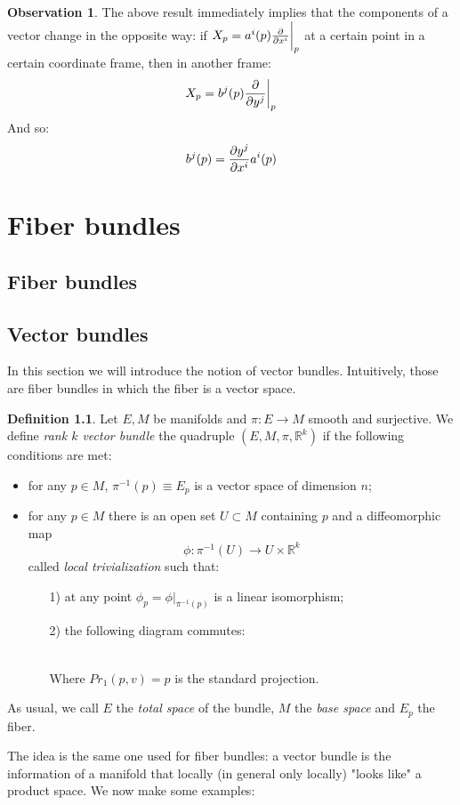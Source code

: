 \documentclass[12pt,a4paper]{report}
\theoremstyle{definition}
\newtheorem{Def}{Definition}[chapter]
\theoremstyle{Theorem}
\theoremstyle{definition}
\theoremstyle{definition}
\newtheorem{Obs}[Def]{Observation}
\begin{document}
			\begin{Obs}
				The above result immediately implies that the components of a vector change in the opposite way: if $X_p=a^i(p){\partial\over \partial x^i}\bigg|_p$ at a certain point in a certain coordinate frame, then in another frame:
				$$X_p=b^j(p){\partial\over \partial y^j}\bigg|_p$$
				And so:
				$$b^j(p)={\partial y^j\over \partial x^i}a^i(p)$$
			\end{Obs}
	\chapter{Fiber bundles}
		\section{Fiber bundles}
		\section{Vector bundles}
			In this section we will introduce the notion of vector bundles. Intuitively, those are fiber bundles in which the fiber is a vector space.
			\begin{Def}
				Let $E,M$ be manifolds and $\pi:E\rightarrow M$ smooth and surjective. We define \textit{rank $k$ vector bundle} the quadruple $(E,M,\pi,\mathbb{R}^k)$ if the following conditions are met:
				\begin{itemize}
					\item for any $p\in M$, $\pi^{-1}(p)\equiv E_p$ is a vector space of dimension $n$;
					\item for any $p\in M$ there is an open set $U\subset M$ containing $p$ and a diffeomorphic map 
					$$\phi:\pi^{-1}(U)\longrightarrow U\times \mathbb{R}^k$$
					called \textit{local trivialization} such that:
					\begin{itemize}
						\item[1)] at any point $\phi_p=\phi\big|_{\pi^{-1}(p)}$ is a linear isomorphism;
						\item[2)] the following diagram commutes:\\\\
						\begin{center}
						\end{center}
						Where $Pr_1(p,v)=p$ is the standard projection. 
					\end{itemize}
				\end{itemize}
				As usual, we call $E$ the \textit{total space} of the bundle, $M$ the  \textit{base space} and $E_p$ the fiber.
			\end{Def}
			The idea is the same one used for fiber bundles: a vector bundle is the information of a manifold that locally (in general only locally) "looks like" a product space. We now make some examples:
\end{document}
